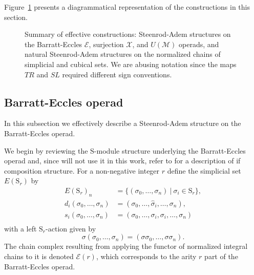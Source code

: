 \documentclass[A4]{amsart}
\theoremstyle{definition}
\newcommand{\End}{\mathrm{End}}
\begin{document}
Figure~\ref{fig: bigsummary} presents a diagrammatical representation of the constructions in this section.

\begin{figure}
	\caption{Summary of effective constructions: Steenrod-Adem structures on the Barratt-Eccles $\mathcal E$, surjection $\mathcal X$, and $U(\mathcal M)$ operads, and natural Steenrod-Adem structures on the normalized chains of simplicial and cubical sets. We are abusing notation since the maps $TR$ and $SL$ required different sign conventions.}
	\label{fig: bigsummary}
\end{figure}

\subsection{Barratt-Eccles operad} In this subsection we effectively describe a Steenrod-Adem structure on the Barratt-Eccles operad.

We begin by reviewing the $\mathrm{S}$-module structure underlying the Barratt-Eccles operad and, since will not use it in this work, refer to \cite{berger04combinatorial} for a description of if composition structure. For a non-negative integer $r$ define the simplicial set $E(\mathrm S_r)$ by 
\begin{equation} \label{eq: milnor model of symmetric}
\begin{split}
E(\mathrm S_r)_n &= \{ (\sigma_0, \dots, \sigma_n)\ |\ \sigma_i \in \mathrm{S}_r\}, \\
d_i(\sigma_0, \dots, \sigma_n) &= (\sigma_0, \dots, \widehat{\sigma}_i, \dots, \sigma_n), \\
s_i(\sigma_0, \dots, \sigma_n) &= (\sigma_0, \dots, \sigma_i, \sigma_i, \dots, \sigma_n) \\
\end{split}
\end{equation}
with a left $\mathrm S_r$-action given by
\begin{equation*}
\sigma (\sigma_0, \dots, \sigma_n) = (\sigma \sigma_0, \dots, \sigma \sigma_n).
\end{equation*} 
The chain complex resulting from applying the functor of normalized integral chains to it is denoted $\mathcal E(r)$, which corresponds to the arity $r$ part of the Barratt-Eccles operad.
\end{document}

